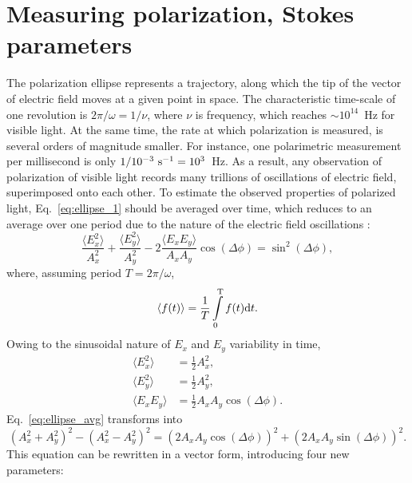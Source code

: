 \section{Measuring polarization, Stokes parameters}
The polarization ellipse represents a trajectory, along which the tip of the vector of electric field  moves at a given point in space.
The characteristic time-scale of one revolution is $2\pi / \omega = 1/\nu$, where $\nu$ is frequency, which reaches $\sim 10^{14}$~Hz for visible light.
At the same time, the rate at which polarization is measured, is several orders of magnitude smaller. 
For instance, one polarimetric measurement per millisecond is only $1 / 10^{-3}~\mathrm{s}^{-1} = 10^3$~Hz.
As a result, any observation of polarization of visible light records many trillions of oscillations of electric field, superimposed onto each other.
To estimate the observed properties of polarized light, Eq.~\ref{eq:ellipse_1} should be averaged over time, which reduces to an average over one period due to the nature of the electric field oscillations \citep{PolarizedLight2}:
\begin{equation}
    \label{eq:ellipse_avg}
    \frac{\langle E_x^2 \rangle }{A_x^2} + \frac{\langle E_y^2 \rangle }{A_y^2} - 2\frac{\langle E_x E_y \rangle }{A_x A_y}\cos(\Delta \phi) = \sin^2 (\Delta \phi),
\end{equation}
where, assuming period $T = 2\pi/\omega$,
\begin{equation}
    \langle f(t) \rangle  = \frac{1}{T}\int\limits_0^{\mathrm{T}} f(t) \mathrm{d}t.
\end{equation}
Owing to the sinusoidal nature of $E_x$ and $E_y$ variability in time,
\begin{equation}
    \begin{aligned}
        \langle E_x^2 \rangle    & = \frac{1}{2}A_x^2, \\
        \langle E_y^2 \rangle    & = \frac{1}{2}A_y^2, \\
        \langle E_x E_y \rangle  & = \frac{1}{2}A_xA_y\cos(\Delta \phi).
    \end{aligned}
\end{equation}
Eq.~\ref{eq:ellipse_avg} transforms into \citep{PolarizedLight2}
\begin{equation}
    (A_x^2 + A_y^2) ^ 2 - (A_x^2 - A_y^2) ^ 2 = (2 A_x A_y \cos(\Delta\phi)) ^ 2 + (2 A_x A_y \sin(\Delta \phi)) ^ 2.
\end{equation}
This equation can be rewritten in a vector form, introducing four new parameters:
